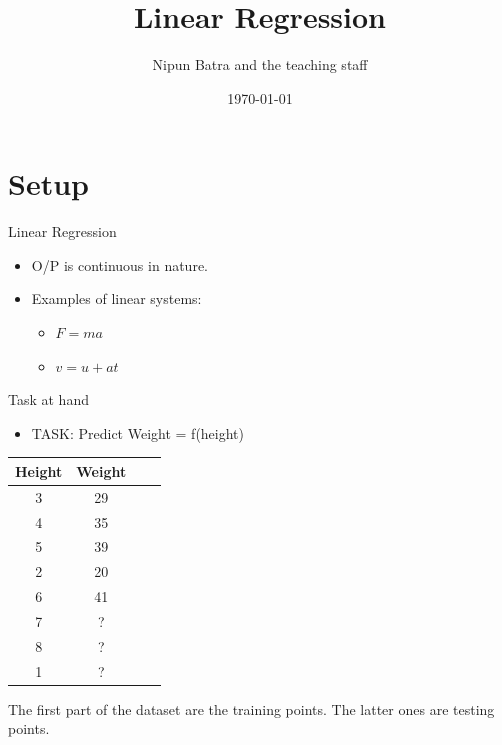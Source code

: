 \documentclass{beamer}
\title{Linear Regression}
\date{\today}
\author{Nipun Batra and the teaching staff}
\institute{IIT Gandhinagar}
\begin{document}
  \maketitle
  

\section{Setup}
  

\begin{frame}{Linear Regression}
\begin{itemize}
	
	
	\item<+-> O/P is continuous in nature.
	\item<+-> Examples of linear systems:
	\begin{itemize}
		\item<+-> $F=ma$
		\item<+-> $v=u+at$
	\end{itemize}
	
\end{itemize}
\end{frame}

\begin{frame}{Task at hand}
\begin{itemize}

\item TASK: Predict Weight = f(height)
\end{itemize}
\begin{center}
    

\begin{tabular}{ |c|c|c|c| } 
\hline
 Height & Weight \\
\hline
3 & 29 \\ 
4 & 35 \\ 
5 & 39\\
2 & 20\\
6 & 41\\
\hline
\hline
7 & ?\\
8 & ?\\
1 &? \\
\hline
\end{tabular}

\end{center}
The first part of the dataset are the training points. The latter ones are testing points.	

\end{frame}
\end{document}
